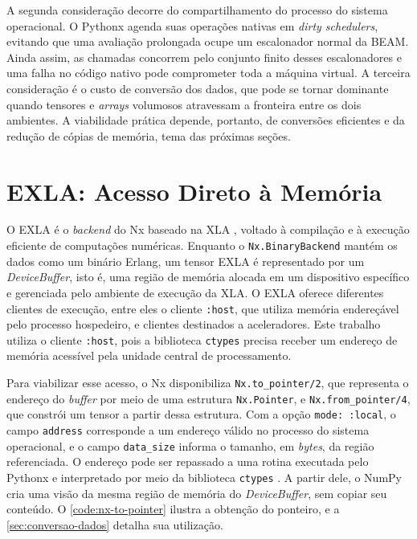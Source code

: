 A segunda consideração decorre do compartilhamento do processo do sistema operacional. O Pythonx agenda suas operações nativas em \textit{dirty schedulers}, evitando que uma avaliação prolongada ocupe um escalonador normal da \gls{BEAM}. Ainda assim, as chamadas concorrem pelo conjunto finito desses escalonadores e uma falha no código nativo pode comprometer toda a máquina virtual. A terceira consideração é o custo de conversão dos dados, que pode se tornar dominante quando tensores e \textit{arrays} volumosos atravessam a fronteira entre os dois ambientes. A viabilidade prática depende, portanto, de conversões eficientes e da redução de cópias de memória, tema das próximas seções.

\section{EXLA: Acesso Direto à Memória}\label{sec:exla-memoria}

O \gls{EXLA} \citep{exla2024} é o \textit{backend} do \gls{Nx} baseado na \gls{XLA} \citep{xla2024}, voltado à compilação e à execução eficiente de computações numéricas. Enquanto o \texttt{Nx.BinaryBackend} mantém os dados como um binário Erlang, um tensor \gls{EXLA} é representado por um \textit{DeviceBuffer}, isto é, uma região de memória alocada em um dispositivo específico e gerenciada pelo ambiente de execução da \gls{XLA}. O \gls{EXLA} oferece diferentes clientes de execução, entre eles o cliente \texttt{:host}, que utiliza memória endereçável pelo processo hospedeiro, e clientes destinados a aceleradores. Este trabalho utiliza o cliente \texttt{:host}, pois a biblioteca \texttt{ctypes} precisa receber um endereço de memória acessível pela unidade central de processamento.

Para viabilizar esse acesso, o \gls{Nx} disponibiliza \texttt{Nx.to\_pointer/2}, que representa o endereço do \textit{buffer} por meio de uma estrutura \texttt{Nx.Pointer}, e \texttt{Nx.from\_pointer/4}, que constrói um tensor a partir dessa estrutura. Com a opção \texttt{mode: :local}, o campo \texttt{address} corresponde a um endereço válido no processo do sistema operacional, e o campo \texttt{data\_size} informa o tamanho, em \textit{bytes}, da região referenciada. O endereço pode ser repassado a uma rotina executada pelo Pythonx e interpretado por meio da biblioteca \texttt{ctypes} \citep{ctypes2024}. A partir dele, o NumPy cria uma visão da mesma região de memória do \textit{DeviceBuffer}, sem copiar seu conteúdo. O \autoref{code:nx-to-pointer} ilustra a obtenção do ponteiro, e a \autoref{sec:conversao-dados} detalha sua utilização.

